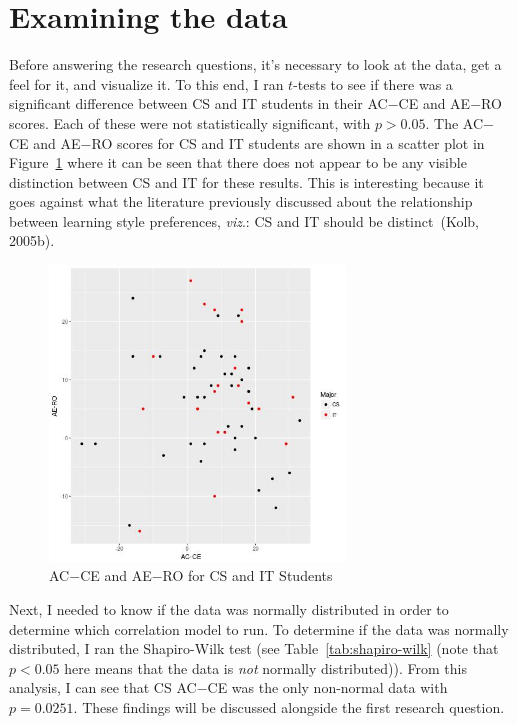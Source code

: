 \section{Examining the data}
Before answering the research questions, it's necessary to look at the data, get a feel for it, and visualize it. To this end, I ran $t$-tests to see if there was a significant difference between CS and IT students in their AC$-$CE and AE$-$RO scores. Each of these were not statistically significant, with $p>0.05$. The AC$-$CE and AE$-$RO scores for CS and IT students are shown in a scatter plot in Figure~\ref{fig:cs-v-it-plot} where it can be seen that there does not appear to be any visible distinction between CS and IT for these results. This is interesting because it goes against what the literature previously discussed about the relationship between learning style preferences, \textit{viz}.: CS and IT should be distinct~(Kolb, 2005b).

\begin{figure}[!bhtb]
  \centering
  \includegraphics[width=0.7\textwidth]{figures/chapter4/cs-v-it-plot.jpg}
  \caption[AC$-$CE and AE$-$RO for CS and IT Students]{AC$-$CE and AE$-$RO for CS and IT Students}
  \label{fig:cs-v-it-plot}
\end{figure}

Next, I needed to know if the data was normally distributed in order to determine which correlation model to run. To determine if the data was normally distributed, I ran the Shapiro-Wilk test (see Table~\ref{tab:shapiro-wilk} (note that $p<0.05$ here means that the data is \emph{not} normally distributed)). From this analysis, I can see that CS AC$-$CE was the only non-normal data with $p=0.0251$. These findings will be discussed alongside the first research question.

